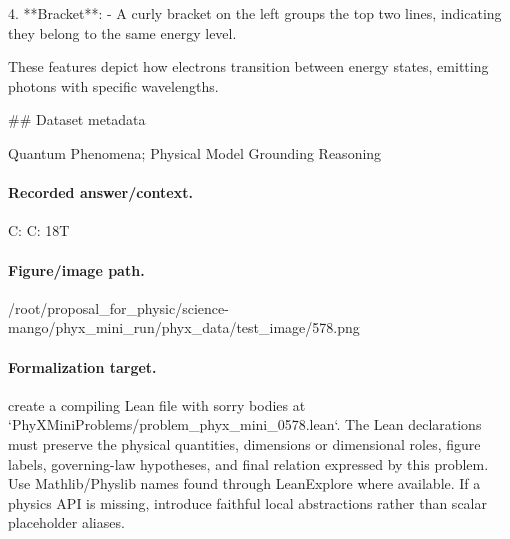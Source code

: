 4. **Bracket**:
   - A curly bracket on the left groups the top two lines, indicating they belong to the same energy level.

These features depict how electrons transition between energy states, emitting photons with specific wavelengths.

\#\# Dataset metadata

Quantum Phenomena; Physical Model Grounding Reasoning

\paragraph{Recorded answer/context.}
C: C: 18T

\paragraph{Figure/image path.}
/root/proposal\_for\_physic/science-mango/phyx\_mini\_run/phyx\_data/test\_image/578.png

\paragraph{Formalization target.}
create a compiling Lean file with sorry bodies at `PhyXMiniProblems/problem\_phyx\_mini\_0578.lean`. The Lean declarations must preserve the physical quantities, dimensions or dimensional roles, figure labels, governing-law hypotheses, and final relation expressed by this problem.
Use Mathlib/Physlib names found through LeanExplore where available. If a physics API is missing, introduce faithful local abstractions rather than scalar placeholder aliases.

